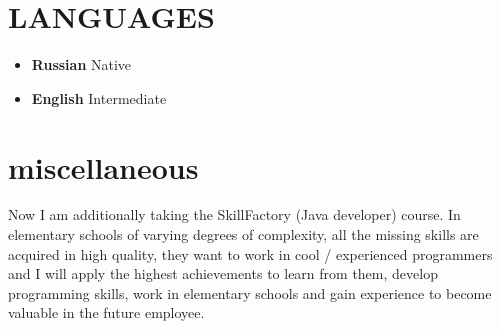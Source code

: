 \documentclass{resume}
\begin{document}
\section{LANGUAGES}{\small
    \begin{itemize}
        \item \textbf{Russian} 
            {\footnotesize Native}{}{}
        \item \textbf{English}
            {\footnotesize Intermediate}{}{}
    \end{itemize}
}
    
\section{miscellaneous}{\small
    \begin{itemize}
         {Now I am additionally taking the SkillFactory (Java developer) course. In elementary schools of varying degrees of complexity, all the missing skills are acquired in high quality, they want to work in cool / experienced programmers and I will apply the highest achievements to learn from them, develop programming skills, work in elementary schools and gain experience to become valuable in the future employee.} 
    \end{itemize}
}
\end{document}
